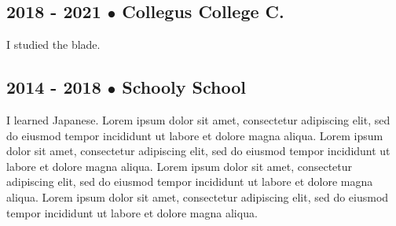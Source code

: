 \subsection{2018 - 2021 $\bullet$ Collegus College C.}
I studied the blade.
\subsection{2014 - 2018 $\bullet$ Schooly School}
I learned Japanese.
Lorem ipsum dolor sit amet, consectetur adipiscing elit, sed do eiusmod tempor incididunt ut labore et dolore magna aliqua. 
Lorem ipsum dolor sit amet, consectetur adipiscing elit, sed do eiusmod tempor incididunt ut labore et dolore magna aliqua. 
Lorem ipsum dolor sit amet, consectetur adipiscing elit, sed do eiusmod tempor incididunt ut labore et dolore magna aliqua. 
Lorem ipsum dolor sit amet, consectetur adipiscing elit, sed do eiusmod tempor incididunt ut labore et dolore magna aliqua. 
